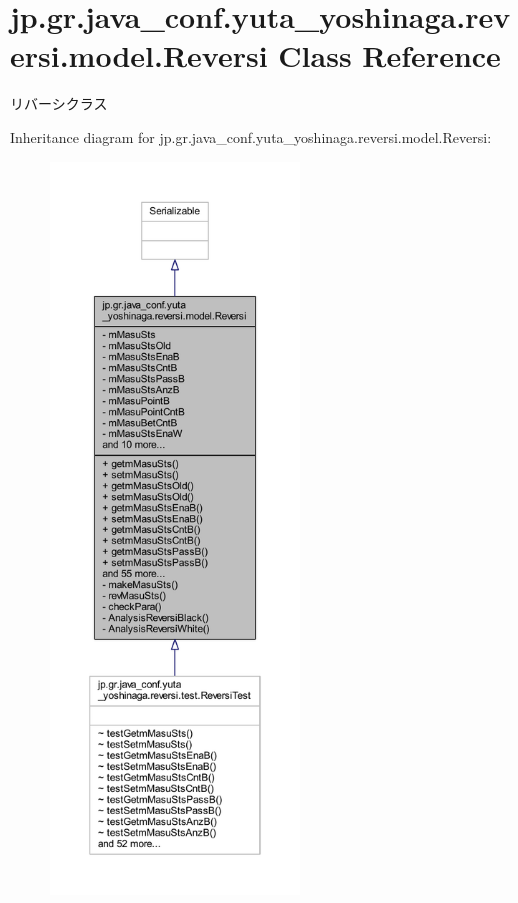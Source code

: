 \hypertarget{classjp_1_1gr_1_1java__conf_1_1yuta__yoshinaga_1_1reversi_1_1model_1_1_reversi}{}\section{jp.\+gr.\+java\+\_\+conf.\+yuta\+\_\+yoshinaga.\+reversi.\+model.\+Reversi Class Reference}
\label{classjp_1_1gr_1_1java__conf_1_1yuta__yoshinaga_1_1reversi_1_1model_1_1_reversi}


リバーシクラス  




Inheritance diagram for jp.\+gr.\+java\+\_\+conf.\+yuta\+\_\+yoshinaga.\+reversi.\+model.\+Reversi\+:\nopagebreak
\begin{figure}[H]
\begin{center}
\leavevmode
\includegraphics[height=550pt]{classjp_1_1gr_1_1java__conf_1_1yuta__yoshinaga_1_1reversi_1_1model_1_1_reversi__inherit__graph}
\end{center}
\end{figure}


